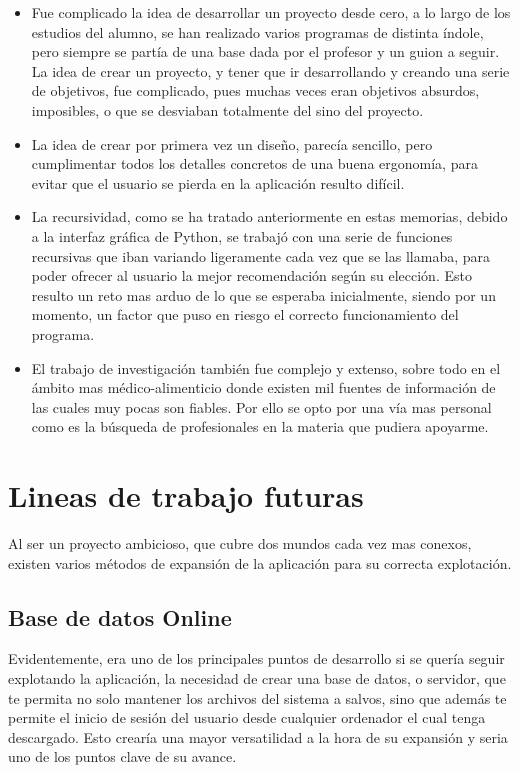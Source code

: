 \begin{itemize}
\item	Fue complicado la idea de desarrollar un proyecto desde cero, a lo largo de los estudios del alumno, se han realizado varios programas de distinta índole, pero siempre se partía de una base dada por el profesor y un guion a seguir. La idea de crear un proyecto, y tener que ir desarrollando y creando una serie de objetivos, fue complicado, pues muchas veces eran objetivos absurdos, imposibles, o que se desviaban totalmente del sino del proyecto.
\item	La idea de crear por primera vez un diseño, parecía sencillo, pero cumplimentar todos los detalles concretos de una buena ergonomía, para evitar que el usuario se pierda en la aplicación resulto difícil.
\item	La recursividad, como se ha tratado anteriormente en estas memorias, debido a la interfaz gráfica de Python, se trabajó con una serie de funciones recursivas que iban variando ligeramente cada vez que se las llamaba, para poder ofrecer al usuario la mejor recomendación según su elección. Esto resulto un reto mas arduo de lo que se esperaba inicialmente, siendo por un momento, un factor que puso en riesgo el correcto funcionamiento del programa.
\item	El trabajo de investigación también fue complejo y extenso, sobre todo en el ámbito mas médico-alimenticio donde existen mil fuentes de información de las cuales muy pocas son fiables. Por ello se opto por una vía mas personal como es la búsqueda de profesionales en la materia que pudiera apoyarme.
\end{itemize}

\section{Lineas de trabajo futuras}
Al ser un proyecto ambicioso, que cubre dos mundos cada vez mas conexos, existen varios métodos de expansión de la aplicación para su correcta explotación.
\subsection{Base de datos Online}
Evidentemente, era uno de los principales puntos de desarrollo si se quería seguir explotando la aplicación, la necesidad de crear una base de datos, o servidor, que te permita no solo mantener los archivos del sistema a salvos, sino que además te permite el inicio de sesión del usuario desde cualquier ordenador el cual tenga descargado. Esto crearía una mayor versatilidad a la hora de su expansión y seria uno de los puntos clave de su avance.
